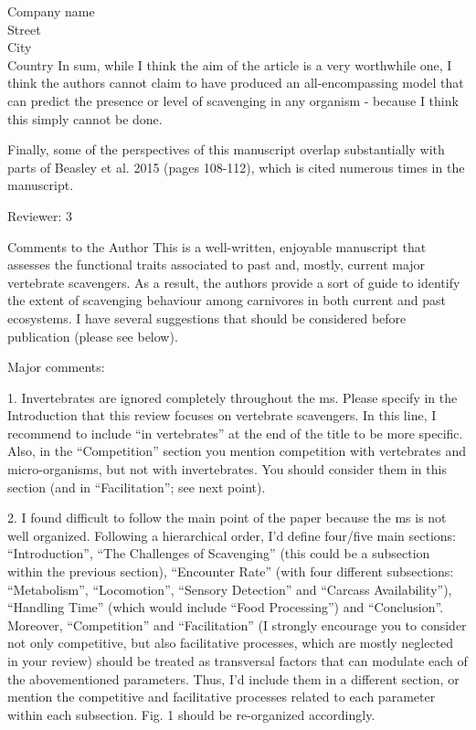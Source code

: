\documentclass{letter}
\begin{document}
\begin{letter}{Company name \\ Street\\ City\\ Country}
In sum, while I think the aim of the article is a very worthwhile one, I think the authors cannot claim to have produced an all-encompassing model that can predict the presence or level of scavenging in any organism - because I think this simply cannot be done.

Finally, some of the perspectives of this manuscript overlap substantially with parts of Beasley et al. 2015 (pages 108-112), which is cited numerous times in the manuscript.

Reviewer: 3

Comments to the Author
This is a well-written, enjoyable manuscript that assesses the functional traits associated to past and, mostly, current major vertebrate scavengers. As a result, the authors provide a sort of guide to identify the extent of scavenging behaviour among carnivores in both current and past ecosystems. I have several suggestions that should be considered before publication (please see below).

Major comments:

1. Invertebrates are ignored completely throughout the ms. Please specify in the Introduction that this review focuses on vertebrate scavengers. In this line, I recommend to include “in vertebrates” at the end of the title to be more specific. Also, in the “Competition” section you mention competition with vertebrates and micro-organisms, but not with invertebrates. You should consider them in this section (and in “Facilitation”; see next point).

2. I found difficult to follow the main point of the paper because the ms is not well organized. Following a hierarchical order, I’d define four/five main sections: “Introduction”, “The Challenges of Scavenging” (this could be a subsection within the previous section), “Encounter Rate” (with four different subsections: “Metabolism”, “Locomotion”, “Sensory Detection” and “Carcass Availability”), “Handling Time” (which would include “Food Processing”) and “Conclusion”. \\ 

Moreover, “Competition” and “Facilitation” (I strongly encourage you to consider not only competitive, but also facilitative processes, which are mostly neglected in your review) should be treated as transversal factors that can modulate each of the abovementioned parameters. Thus, I’d include them in a different section, or mention the competitive and facilitative processes related to each parameter within each subsection. Fig. 1 should be re-organized accordingly.


\end{letter}
\end{document}
